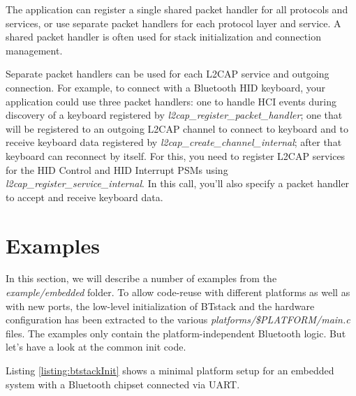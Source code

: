\documentclass[a4paper,titlepage,oneside,12pt]{amsart} %
\newcommand{\urlfoot}[2]{\href{#1}{{\color{blue} #2}}\footnote{#1}}
\begin{document}
The application can register a single shared packet handler for all protocols and services, or use separate packet handlers for each protocol layer and service. A shared packet handler is often used for stack initialization and connection management.

Separate packet handlers can be used for each L2CAP service and outgoing connection. For example, to connect with a Bluetooth HID keyboard, your application could use three packet handlers: one to handle HCI events during discovery of a keyboard registered by \emph{l2cap\_register\_packet\_handler}; one that will be registered to an outgoing L2CAP channel to connect to keyboard and to receive keyboard data registered by \emph{l2cap\_create\_channel\_internal}; after that keyboard can reconnect by itself. For this, you need to register L2CAP services for the HID Control and HID Interrupt PSMs using \emph{l2cap\_register\_service\_internal}. In this call, you'll also specify a packet handler to accept and receive keyboard data. 

\newcommand{\BluetoothSpecification}{\urlfoot{https://www.bluetooth.org/Technical/Specifications/adopted.htm}{Bluetooth Specification}}
\newcommand{\BluetoothSpecificationURL}{\href{https://www.bluetooth.org/Technical/Specifications/adopted.htm}{\color{blue} Bluetooth Specification}}



\pagebreak 
\section{Examples}
\label{section:examples}

In this section, we will describe a number of examples from the \emph{example/embedded} folder. To allow code-reuse with different platforms as well as with new ports, the low-level initialization of BTstack and the hardware configuration has been extracted to the various \emph{platforms/\$PLATFORM/main.c} files. The examples only contain the platform-independent Bluetooth logic. But let's have a look at the common init code. 

Listing \ref{listing:btstackInit} shows a minimal platform setup for an embedded system with a Bluetooth chipset connected via UART.
\end{document}
